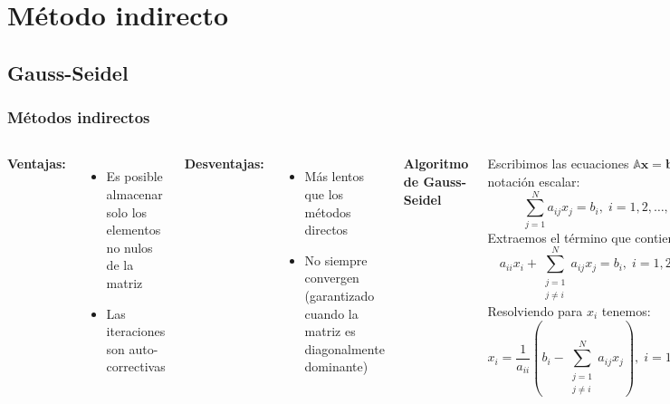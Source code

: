 \documentclass[9pt, aspectratio=169]{beamer}
\begin{document}
\section{Método indirecto}
\subsection{Gauss-Seidel}
\begin{frame}
 \frametitle{Métodos indirectos}
 \begin{columns}[]
\textbf{Ventajas:}
\begin{itemize}
 \item Es posible almacenar solo los elementos no nulos de la matriz
 \item Las iteraciones son auto-correctivas
\end{itemize}
\bigskip \pause

\textbf{Desventajas:}
\begin{itemize}
 \item Más lentos que los métodos directos
 \item No siempre convergen (garantizado cuando la matriz es diagonalmente dominante)
\end{itemize}
\pause
{}
\textbf{Algoritmo de Gauss-Seidel}

Escribimos las ecuaciones $\mathbb{A} \mathbf{x}= \mathbf{b}$ en notación escalar:
\begin{equation*}
 \sum_{j=1}^N a_{ij}x_j = b_i, \; i = 1, 2, \ldots, n
\end{equation*}
Extraemos el término que contiene $x_i$:
\begin{equation*}
 a_{ii}x_i + \sum_{\substack{j=1 \\j \neq i}}^N a_{ij}x_j = b_i, \; i = 1, 2, \ldots, n
\end{equation*}
Resolviendo para $x_i$ tenemos:
\begin{equation*}
 x_i = \dfrac{1}{a_{ii}} \left( b_i - \sum_{\substack{j=1 \\j \neq i}}^N a_{ij}x_j \right), \;  i = 1, 2, \ldots, n
\end{equation*}

 \end{columns}
\end{frame}

\end{document}
